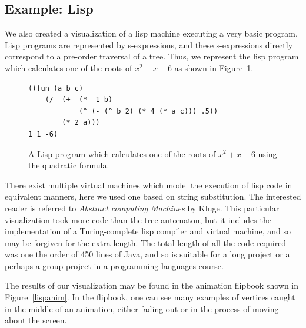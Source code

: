 \documentclass{article}
\begin{document}
\subsection{Example: Lisp}

We also created a visualization of a lisp machine executing a very basic program.  Lisp programs are represented by s-expressions, and these s-expressions directly correspond to a pre-order traversal of a tree.  Thus, we represent the lisp program which calculates one of the roots of $x^2+x-6$ as shown in Figure~\ref{lispprog}.
\begin{figure}
\begin{verbatim}((fun (a b c) 
    (/  (+  (* -1 b) 
            (^ (- (^ b 2) (* 4 (* a c))) .5)) 
        (* 2 a)))  
1 1 -6)
\end{verbatim}
\caption{A Lisp program which calculates one of the roots of $x^2+x-6$ using the quadratic formula.}
\label{lispprog}
\end{figure}

There exist multiple virtual machines which model the execution of lisp code in equivalent manners, here we used one based on string substitution.  The interested reader is referred to {\it Abstract computing Machines} by Kluge\cite{acm}.  This particular visualization took more code than the tree automaton, but it includes the implementation of a Turing-complete lisp compiler and virtual machine, and so may be forgiven for the extra length.  The total length of all the code required was one the order of 450 lines of Java, and so is suitable for a long project or a perhaps a group project in a programming languages course.

The results of our visualization may be found in the animation flipbook shown
in Figure~\ref{lispanim}. In the flipbook, one can see many examples of
vertices caught in the middle of an animation, either fading out or in the process of moving about the screen.  
\end{document}
